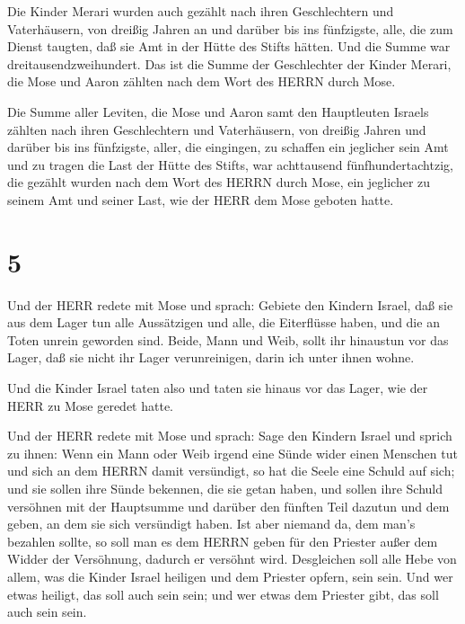  Die Kinder Merari wurden auch gezählt nach ihren
Geschlechtern und Vaterhäusern,  von dreißig Jahren an und
darüber bis ins fünfzigste, alle, die zum Dienst taugten, daß sie Amt in
der Hütte des Stifts hätten.  Und die Summe war
dreitausendzweihundert.  Das ist die Summe der Geschlechter
der Kinder Merari, die Mose und Aaron zählten nach dem Wort des HERRN
durch Mose.

 Die Summe aller Leviten, die Mose und Aaron samt den
Hauptleuten Israels zählten nach ihren Geschlechtern und Vaterhäusern,
 von dreißig Jahren und darüber bis ins fünfzigste, aller,
die eingingen, zu schaffen ein jeglicher sein Amt und zu tragen die Last
der Hütte des Stifts,  war achttausend fünfhundertachtzig,
 die gezählt wurden nach dem Wort des HERRN durch Mose, ein
jeglicher zu seinem Amt und seiner Last, wie der HERR dem Mose geboten
hatte.

\hypertarget{section-4}{%
\section{5}\label{section-4}}

 Und der HERR redete mit Mose und sprach: 
Gebiete den Kindern Israel, daß sie aus dem Lager tun alle Aussätzigen
und alle, die Eiterflüsse haben, und die an Toten unrein geworden sind.
 Beide, Mann und Weib, sollt ihr hinaustun vor das Lager,
daß sie nicht ihr Lager verunreinigen, darin ich unter ihnen wohne.

 Und die Kinder Israel taten also und taten sie hinaus vor
das Lager, wie der HERR zu Mose geredet hatte.

 Und der HERR redete mit Mose und sprach:  Sage
den Kindern Israel und sprich zu ihnen: Wenn ein Mann oder Weib irgend
eine Sünde wider einen Menschen tut und sich an dem HERRN damit
versündigt, so hat die Seele eine Schuld auf sich;  und sie
sollen ihre Sünde bekennen, die sie getan haben, und sollen ihre Schuld
versöhnen mit der Hauptsumme und darüber den fünften Teil dazutun und
dem geben, an dem sie sich versündigt haben.  Ist aber
niemand da, dem man's bezahlen sollte, so soll man es dem HERRN geben
für den Priester außer dem Widder der Versöhnung, dadurch er versöhnt
wird.  Desgleichen soll alle Hebe von allem, was die Kinder
Israel heiligen und dem Priester opfern, sein sein.  Und
wer etwas heiligt, das soll auch sein sein; und wer etwas dem Priester
gibt, das soll auch sein sein.

